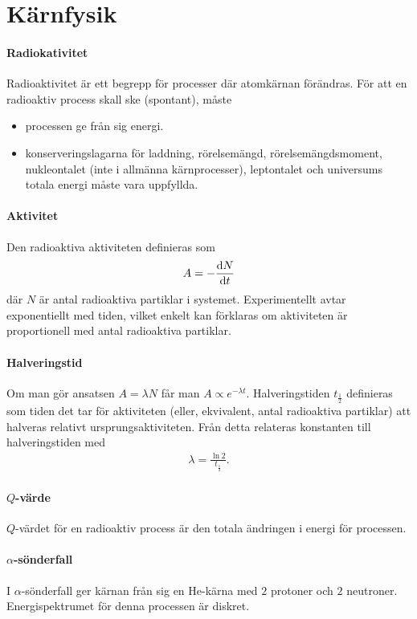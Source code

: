 \section{Kärnfysik}

\paragraph{Radiokativitet}
Radioaktivitet är ett begrepp för processer där atomkärnan förändras. För att en radioaktiv process skall ske (spontant), måste
\begin{itemize}
	\item processen ge från sig energi.
	\item konserveringslagarna för laddning, rörelsemängd, rörelsemängdsmoment, nukleontalet (inte i allmänna kärnprocesser), leptontalet och universums totala energi måste vara uppfyllda.
\end{itemize}

\paragraph{Aktivitet}
Den radioaktiva aktiviteten definieras som
\begin{align*}
	A = -\dv{N}{t}
\end{align*}
där $N$ är antal radioaktiva partiklar i systemet. Experimentellt avtar exponentiellt med tiden, vilket enkelt kan förklaras om aktiviteten är proportionell med antal radioaktiva partiklar.

\paragraph{Halveringstid}
Om man gör ansatsen $A = \lambda N$ får man $A\propto e^{-\lambda t}$. Halveringstiden $t_{\frac{1}{2}}$ definieras som tiden det tar för aktiviteten (eller, ekvivalent, antal radioaktiva partiklar) att halveras relativt ursprungsaktiviteten. Från detta relateras konstanten till halveringstiden med
\begin{align*}
	\lambda = \frac{\ln{2}}{t_{\frac{1}{2}}}.
\end{align*}

\paragraph{$Q$-värde}
$Q$-värdet för en radioaktiv process är den totala ändringen i energi för processen.

\paragraph{$\alpha$-sönderfall}
I $\alpha$-sönderfall ger kärnan från sig en He-kärna med $2$ protoner och $2$ neutroner. Energispektrumet för denna processen är diskret.

